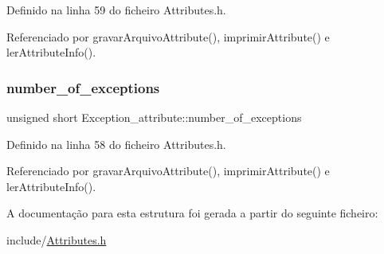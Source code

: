 Definido na linha 59 do ficheiro Attributes.\+h.



Referenciado por gravar\+Arquivo\+Attribute(), imprimir\+Attribute() e ler\+Attribute\+Info().

\mbox{\label{structException__attribute_a120f2121de6e235a4532042a64feeb69}} 
\subsubsection{\texorpdfstring{number\+\_\+of\+\_\+exceptions}{number\_of\_exceptions}}
{\footnotesize\ttfamily unsigned short Exception\+\_\+attribute\+::number\+\_\+of\+\_\+exceptions}



Definido na linha 58 do ficheiro Attributes.\+h.



Referenciado por gravar\+Arquivo\+Attribute(), imprimir\+Attribute() e ler\+Attribute\+Info().



A documentação para esta estrutura foi gerada a partir do seguinte ficheiro\+:\begin{DoxyCompactItemize}
\item 
include/\hyperlink{Attributes_8h}{Attributes.\+h}\end{DoxyCompactItemize}
